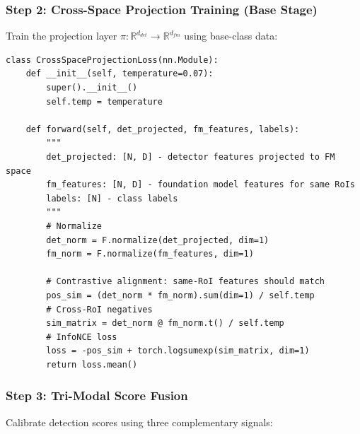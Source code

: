 \documentclass[11pt,a4paper]{article}
\begin{document}
\subsubsection{Step 2: Cross-Space Projection Training (Base Stage)}

Train the projection layer $\pi: \mathbb{R}^{d_{det}} \rightarrow \mathbb{R}^{d_{fm}}$ using base-class data:

\begin{lstlisting}[caption={Cross-space projection training}]
class CrossSpaceProjectionLoss(nn.Module):
    def __init__(self, temperature=0.07):
        super().__init__()
        self.temp = temperature

    def forward(self, det_projected, fm_features, labels):
        """
        det_projected: [N, D] - detector features projected to FM space
        fm_features: [N, D] - foundation model features for same RoIs
        labels: [N] - class labels
        """
        # Normalize
        det_norm = F.normalize(det_projected, dim=1)
        fm_norm = F.normalize(fm_features, dim=1)

        # Contrastive alignment: same-RoI features should match
        pos_sim = (det_norm * fm_norm).sum(dim=1) / self.temp
        # Cross-RoI negatives
        sim_matrix = det_norm @ fm_norm.t() / self.temp
        # InfoNCE loss
        loss = -pos_sim + torch.logsumexp(sim_matrix, dim=1)
        return loss.mean()
\end{lstlisting}

\subsubsection{Step 3: Tri-Modal Score Fusion}

Calibrate detection scores using three complementary signals:
\end{document}
